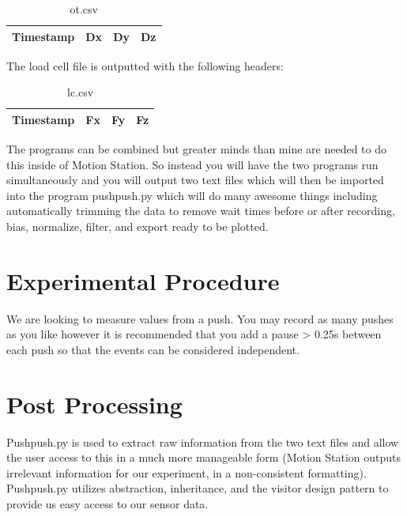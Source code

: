 \documentclass[pdftex,11pt,letterpaper]{article}
\begin{document}
\begin{table}[h!]
\begin{center}
    \begin{tabular}{ | l | l | l | l |}
    \hline
    Timestamp & Dx & Dy & Dz \\ \hline
	\end{tabular}
	\caption{ot.csv}
\end{center}
\end{table}

The load cell file is outputted with the following headers:

\begin{table}[h!]
\begin{center}
    \begin{tabular}{ | l | l | l | l |}
    \hline
    Timestamp & Fx & Fy & Fz \\ \hline
	\end{tabular}
	\caption{lc.csv}
\end{center}
\end{table}

The programs can be combined but greater minds than mine are needed to do this inside of Motion Station. So instead you will have the two programs run simultaneously and you will output two text files which will then be imported into the program pushpush.py which will do many awesome things including automatically trimming the data to remove wait times before or after recording, bias, normalize, filter, and export ready to be plotted. 

\section{Experimental Procedure}
We are looking to measure values from a push. You may record as many pushes as you like however it is recommended that you add a pause > 0.25s between each push so that the events can be considered independent.

\section{Post Processing}
Pushpush.py is used to extract raw information from the two text files and allow the user access to this in a much more manageable form (Motion Station outputs irrelevant information for our experiment, in a non-consistent formatting). Pushpush.py utilizes abstraction, inheritance, and the visitor design pattern to provide us easy access to our sensor data. \\
\end{document}
